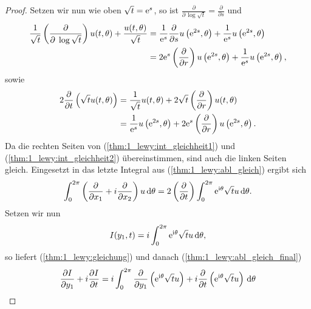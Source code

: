\begin{proof}
Setzen wir nun wie oben $\sqrt{t}=\mathrm e^s$, so ist $\frac{\partial}{\partial \,\log \sqrt{t}}=\frac{\partial}{\partial s}$ und
\begin{align}\label{thm:1_lewy:int_gleichheit1}
\begin{split}
\frac{1}{\sqrt{t}}\left(\frac{\partial}{\partial\;\log\sqrt{t}}\right)u(t,\theta) + \frac{u(t,\theta)}{\sqrt{t}}
&= \frac{1}{\mathrm e^s} \frac{\partial}{\partial s} u\left(\mathrm e^{2s},\theta\right)+\frac{1}{\mathrm e^s}u\left(\mathrm e^{2s},\theta\right) \\
&= 2\mathrm e^s \left(\frac{\partial}{\partial r}\right) u\left(\mathrm e^{2s},\theta\right)+\frac{1}{\mathrm e^s} u\left(\mathrm e^{2s},\theta\right),
\end{split}
\end{align}
sowie
\begin{align}\label{thm:1_lewy:int_gleichheit2}
\begin{split}
2\frac{\partial}{\partial t}\left(\sqrt{t} u(t,\theta)\right) 
&= \frac{1}{\sqrt{t}}u(t,\theta)+2\sqrt{t}\left(\frac{\partial}{\partial r}\right)u(t,\theta)\\
&= \frac{1}{\mathrm e^s}u\left(\mathrm e^{2s},\theta\right) +2 \mathrm e^s \left(\frac{\partial}{\partial r}\right)u\left(\mathrm e^{2s},\theta\right).
\end{split}
\end{align}
Da die rechten Seiten von (\ref{thm:1_lewy:int_gleichheit1}) und (\ref{thm:1_lewy:int_gleichheit2}) übereinstimmen, sind auch die linken Seiten gleich. Eingesetzt in das letzte Integral aus (\ref{thm:1_lewy:abl_gleich}) ergibt sich
\begin{align}\label{thm:1_lewy:abl_gleich_final}
\begin{split}
\int_0^{2\pi} \left(\frac{\partial}{\partial x_1} +i\frac{\partial}{\partial x_2}\right)u\,\mathrm d\theta 
= 2\left(\frac{\partial}{\partial t}\right)\int_0^{2\pi} \mathrm e^{\mathrm i\theta}\sqrt{t}u\,\mathrm d\theta.
\end{split}
\end{align}
Setzen wir nun 
\begin{equation}
I(y_1,t)=i\int_0^{2\pi} \mathrm e^{\mathrm i\theta} \sqrt{t}u\,\mathrm d\theta,
\end{equation}
so liefert (\ref{thm:1_lewy:gleichung}) und danach (\ref{thm:1_lewy:abl_gleich_final})
\begin{align}
\begin{split}
\frac{\partial I}{\partial y_1} +i\frac{\partial I}{\partial t} 
&= i\int_{0}^{2\pi} \frac{\partial}{\partial y_1}\left(\e^{\i\theta}\sqrt{t}u\right)+i\frac{\partial}{\partial t}\left(\e^{\i\theta}\sqrt{t}u\right)\d\theta \\

\end{split}
\end{align}
\end{proof}
